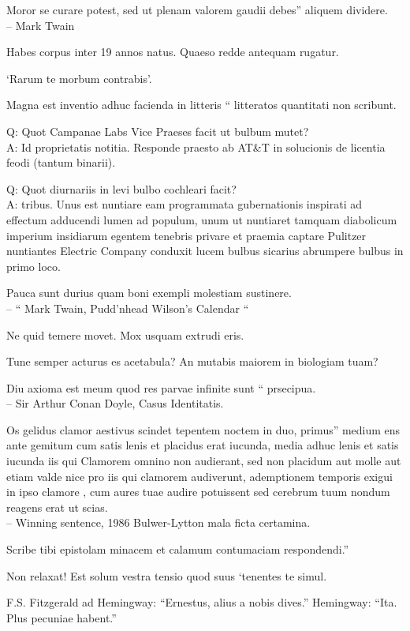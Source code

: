 \documentclass[titlepage,12pt]{memoir}
\begin{document}
Moror se curare potest, sed ut plenam valorem gaudii debes”
aliquem dividere.
\\-- Mark Twain

Habes corpus inter 19 annos natus. Quaeso redde antequam rugatur.

‘Rarum te morbum contrabis’.

 Magna est inventio adhuc facienda in litteris “
litteratos quantitati non scribunt.

Q: Quot Campanae Labs Vice Praeses facit ut bulbum mutet?\\
A: Id proprietatis notitia. Responde praesto ab AT\&T in solucionis
de licentia feodi (tantum binarii).

Q: Quot diurnariis in levi bulbo cochleari facit?\\
A: tribus. Unus est nuntiare eam programmata gubernationis inspirati ad effectum adducendi
lumen ad populum, unum ut nuntiaret tamquam diabolicum imperium insidiarum
egentem tenebris privare et praemia captare Pulitzer
nuntiantes Electric Company conduxit lucem bulbus sicarius abrumpere
bulbus in primo loco.

 Pauca sunt durius quam boni exempli molestiam sustinere.
\\-- “ Mark Twain, Pudd’nhead Wilson’s Calendar “

Ne quid temere movet. Mox usquam extrudi eris.

Tune semper acturus es acetabula? An mutabis maiorem in biologiam tuam?

 Diu axioma est meum quod res parvae infinite sunt “
prsecipua.
\\-- Sir Arthur Conan Doyle, Casus Identitatis.

Os gelidus clamor aestivus scindet tepentem noctem in duo, primus”
medium ens ante gemitum cum satis lenis et placidus erat
iucunda, media adhuc lenis et satis iucunda iis qui
Clamorem omnino non audierant, sed non placidum aut molle aut etiam valde nice
pro iis qui clamorem audiverunt, ademptionem temporis exigui
in ipso clamore , cum aures tuae audire potuissent
sed cerebrum tuum nondum reagens erat ut scias.
\\-- Winning sentence, 1986 Bulwer-Lytton mala ficta certamina.

Scribe tibi epistolam minacem et calamum contumaciam respondendi.”

Non relaxat! Est solum vestra tensio quod suus ‘tenentes te simul.

F.S. Fitzgerald ad Hemingway:
“Ernestus, alius a nobis dives.”
Hemingway:
“Ita. Plus pecuniae habent.”
\end{document}
